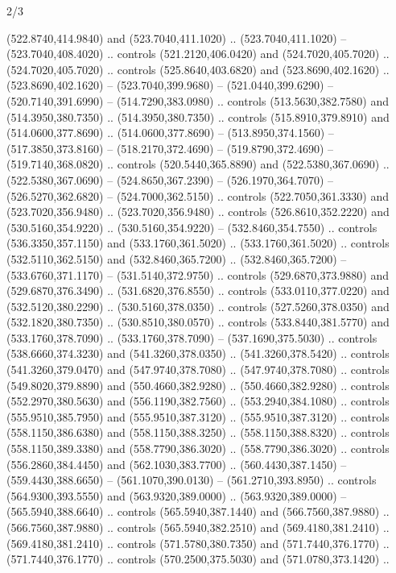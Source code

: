 \begin{flagdescription}{2/3}
\begin{scope}[xshift=0.5\flaglength,yshift=0.5\flagwidth,scale=\flagwidth/638.38]
\begin{scope}[y=0.80pt, x=0.80pt, yscale=-1,shift={(-600,-400)}]
\begin{scope}[shift={(-0.02,2.173)}]
  (522.8740,414.9840) and (523.7040,411.1020) .. (523.7040,411.1020) --
  (523.7040,408.4020) .. controls (521.2120,406.0420) and (524.7020,405.7020) ..
  (524.7020,405.7020) .. controls (525.8640,403.6820) and (523.8690,402.1620) ..
  (523.8690,402.1620) -- (523.7040,399.9680) -- (521.0440,399.6290) --
  (520.7140,391.6990) -- (514.7290,383.0980) .. controls (513.5630,382.7580) and
  (514.3950,380.7350) .. (514.3950,380.7350) .. controls (515.8910,379.8910) and
  (514.0600,377.8690) .. (514.0600,377.8690) -- (513.8950,374.1560) --
  (517.3850,373.8160) -- (518.2170,372.4690) -- (519.8790,372.4690) --
  (519.7140,368.0820) .. controls (520.5440,365.8890) and (522.5380,367.0690) ..
  (522.5380,367.0690) -- (524.8650,367.2390) -- (526.1970,364.7070) --
  (526.5270,362.6820) -- (524.7000,362.5150) .. controls (522.7050,361.3330) and
  (523.7020,356.9480) .. (523.7020,356.9480) .. controls (526.8610,352.2220) and
  (530.5160,354.9220) .. (530.5160,354.9220) -- (532.8460,354.7550) .. controls
  (536.3350,357.1150) and (533.1760,361.5020) .. (533.1760,361.5020) .. controls
  (532.5110,362.5150) and (532.8460,365.7200) .. (532.8460,365.7200) --
  (533.6760,371.1170) -- (531.5140,372.9750) .. controls (529.6870,373.9880) and
  (529.6870,376.3490) .. (531.6820,376.8550) .. controls (533.0110,377.0220) and
  (532.5120,380.2290) .. (530.5160,378.0350) .. controls (527.5260,378.0350) and
  (532.1820,380.7350) .. (530.8510,380.0570) .. controls (533.8440,381.5770) and
  (533.1760,378.7090) .. (533.1760,378.7090) -- (537.1690,375.5030) .. controls
  (538.6660,374.3230) and (541.3260,378.0350) .. (541.3260,378.5420) .. controls
  (541.3260,379.0470) and (547.9740,378.7080) .. (547.9740,378.7080) .. controls
  (549.8020,379.8890) and (550.4660,382.9280) .. (550.4660,382.9280) .. controls
  (552.2970,380.5630) and (556.1190,382.7560) .. (553.2940,384.1080) .. controls
  (555.9510,385.7950) and (555.9510,387.3120) .. (555.9510,387.3120) .. controls
  (558.1150,386.6380) and (558.1150,388.3250) .. (558.1150,388.8320) .. controls
  (558.1150,389.3380) and (558.7790,386.3020) .. (558.7790,386.3020) .. controls
  (556.2860,384.4450) and (562.1030,383.7700) .. (560.4430,387.1450) --
  (559.4430,388.6650) -- (561.1070,390.0130) -- (561.2710,393.8950) .. controls
  (564.9300,393.5550) and (563.9320,389.0000) .. (563.9320,389.0000) --
  (565.5940,388.6640) .. controls (565.5940,387.1440) and (566.7560,387.9880) ..
  (566.7560,387.9880) .. controls (565.5940,382.2510) and (569.4180,381.2410) ..
  (569.4180,381.2410) .. controls (571.5780,380.7350) and (571.7440,376.1770) ..
  (571.7440,376.1770) .. controls (570.2500,375.5030) and (571.0780,373.1420) ..

\end{scope}
\end{scope}
\end{scope}
\end{flagdescription}
